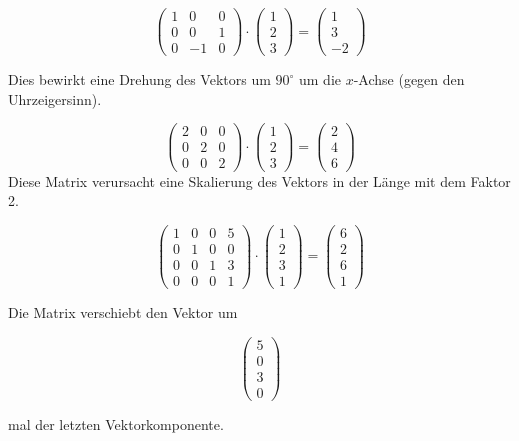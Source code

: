 \documentclass[a4paper]{scrartcl}
\begin{document}
\[
	\begin{pmatrix}
	1 & 0 & 0\\
	0 & 0 & 1 \\
	0 & -1 & 0
	\end{pmatrix}\cdot
	\begin{pmatrix}
	1 \\ 2 \\ 3
	\end{pmatrix}=
	\begin{pmatrix}
	1 \\ 3 \\ -2
	\end{pmatrix}
\]

Dies bewirkt eine Drehung des Vektors um $90^\circ$ um die $x$-Achse (gegen den Uhrzeigersinn).

\[
	\begin{pmatrix}
	2 & 0 & 0\\
	0 & 2 & 0\\
	0 & 0 & 2
	\end{pmatrix}\cdot
	\begin{pmatrix}
	1 \\ 2 \\ 3
	\end{pmatrix}=
	\begin{pmatrix}
	2 \\ 4 \\ 6
	\end{pmatrix}
\]
Diese Matrix verursacht eine Skalierung des Vektors in der Länge mit dem Faktor 2.

\[
	\begin{pmatrix}
	1 & 0 & 0 & 5\\
	0 & 1 & 0 & 0\\
	0 & 0 & 1 & 3\\
	0 & 0 & 0 & 1
	\end{pmatrix}\cdot
	\begin{pmatrix}
	1 \\ 2 \\ 3 \\ 1
	\end{pmatrix}=
	\begin{pmatrix}
	6 \\ 2 \\ 6 \\ 1
	\end{pmatrix}
\]

Die Matrix verschiebt den Vektor um

\[
	\begin{pmatrix}
	5 \\ 0 \\ 3 \\ 0
	\end{pmatrix}
\]

mal der letzten Vektorkomponente.
\end{document}

